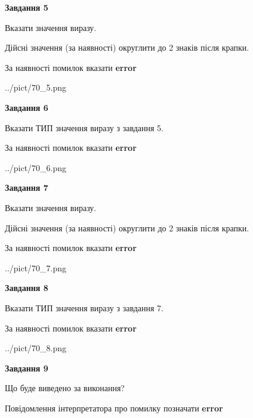 \documentclass[11pt, ukrainian]{article}
\begin{document}
{\begin {large}
{\begin {center}\textbf{Завдання 5}\end {center}}\par
Вказати значення виразу. \par
Дійсні значення (за наявності) округлити до 2 знаків після крапки. \par
За наявності помилок вказати \textbf{error}

\begin{center}
	{../pict/70_5.png}
\end{center}
\newpage

{\begin {center}\textbf{Завдання 6}\end {center}}\par
Вказати ТИП значення виразу з завдання 5. \par
За наявності помилок вказати \textbf{error}

\begin{center}
	{../pict/70_6.png}
\end{center}
\newpage

{\begin {center}\textbf{Завдання 7}\end {center}}\par
Вказати значення виразу. \par
Дійсні значення (за наявності) округлити до 2 знаків після крапки. \par
За наявності помилок вказати \textbf{error}

\begin{center}
	{../pict/70_7.png}
\end{center}
\newpage

{\begin {center}\textbf{Завдання 8}\end {center}}\par
Вказати ТИП значення виразу з завдання 7. \par
За наявності помилок вказати \textbf{error}

\begin{center}
	{../pict/70_8.png}
\end{center}
\newpage

{\begin {center}\textbf{Завдання 9}\end {center}}\par
Що буде виведено за виконання? \par
Повідомлення інтерпретатора про помилку позначати \textbf{error}


\end{large}}
\end{document}
